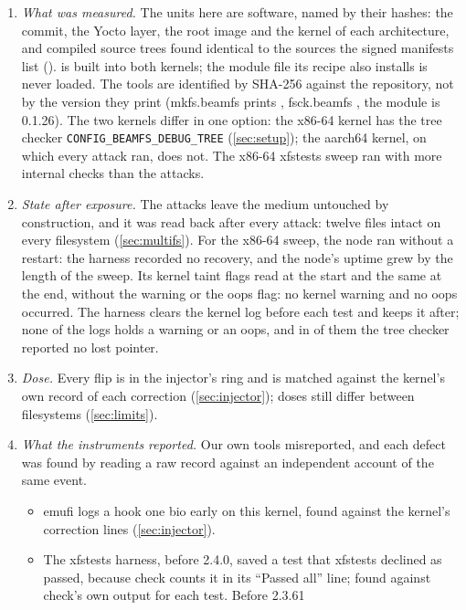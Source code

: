 \begin{enumerate}[label=(\alph*)]
\item \emph{What was measured.} The units here are software, named by
  their hashes: the \bfs commit, the Yocto layer, the root image and the
  kernel of each architecture, and \srcTrees{} compiled source trees found
  identical to the sources the signed manifests list (\apprepro). \bfs
  is built into both kernels; the module file its recipe also installs
  is never loaded. The tools are identified by SHA-256 against the
  repository, not by the version they print (mkfs.beamfs prints
  \xfsXMkfsVersion, fsck.beamfs \xfsXFsckVersion, the module is 0.1.26).
  The two kernels differ in one \bfs option: the x86-64 kernel has
  the tree checker \texttt{CONFIG\_BEAMFS\_DEBUG\_TREE}
  (\cref{sec:setup}); the aarch64 kernel, on which every attack ran, does
  not. The x86-64 xfstests sweep ran with more internal checks than the
  attacks.
\item \emph{State after exposure.} The attacks leave the medium
  untouched by construction, and it was read back after every attack:
  twelve files intact on every filesystem (\cref{sec:multifs}). For the
  x86-64 sweep, the node ran without a restart: the harness recorded no
  recovery, and the node's uptime grew by the length of the sweep. Its
  kernel taint flags read \xfsXtaintStart{} at the start and the same at
  the end, without the warning or the oops flag: no kernel warning and
  no oops occurred. The harness clears the kernel log before each test
  and keeps it after; none of the \xfsXkernLogs{} logs holds a warning or
  an oops, and in \xfsXtreeLogs{} of them the tree checker reported no
  lost pointer.
\item \emph{Dose.} Every flip is in the injector's ring and is matched
  against the kernel's own record of each correction
  (\cref{sec:injector}); doses still differ between filesystems
  (\cref{sec:limits}).
\item \emph{What the instruments reported.} Our own tools misreported,
  and each defect was found by reading a raw record against an
  independent account of the same event.
  \begin{itemize}
  \item emufi logs a hook one bio early on this kernel, found against
    the kernel's correction lines (\cref{sec:injector}).
  \item The xfstests harness, before 2.4.0, saved a test that xfstests
    declined as passed, because check counts it in its ``Passed all''
    line; found against check's own output for each test. Before 2.3.61

\end{itemize}
\end{enumerate}
